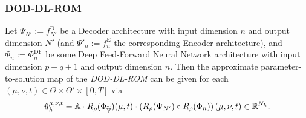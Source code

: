 \subsubsection{DOD-DL-ROM} \label{subsec: dod-dl-rom}





Let $\Psi_{N'} := f_{N'}^\text{D}$ be a Decoder architecture with input dimension $n$ and output dimension $N'$ 
(and $\Psi'_n := f_n^\text{E}$ the corresponding Encoder architecture), and $\Phi_n := \Phi_n^\text{DF}$
be some Deep Feed-Forward Neural Network architecture with input dimension $p+q+1$ and output dimension $n$.
Then the approximate parameter-to-solution map of the \emph{DOD-DL-ROM} 
can be given for each $(\mu, \nu, t) \in \Theta \times \Theta'
\times [0, T]$ via
\begin{equation} \label{eq: dod-dl-rom solution}
    \hat{u}_h^{\mu, \nu, t} = \mathbb{A} \cdot R_\rho(\Phi_{\widetilde{\mathbb{V}}})(\mu, t) \cdot 
    \left(R_\rho(\Psi_{N'}) \circ R_\rho(\Phi_n)\right) (\mu, \nu, t) \in \mathbb{R}^{N_h}.
\end{equation}

